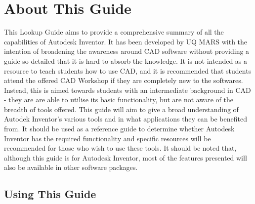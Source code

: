 \section{About This Guide}

This Lookup Guide aims to provide a comprehensive summary of all the capabilities of Autodesk Inventor. It has been developed by UQ MARS with the intention of broadening the awareness around CAD software without providing a guide so detailed that it is hard to absorb the knowledge. It is not intended as a resource to teach students how to use CAD, and it is recommended that students attend the offered CAD Workshop if they are completely new to the softwares. Instead, this is aimed towards students with an intermediate background in CAD - they are are able to utilise its basic functionality, but are not aware of the breadth of tools offered. This guide will aim to give a broad understanding of Autodek Inventor's various tools and in what applications they can be benefited from. It should be used as a reference guide to determine whether Autodesk Inventor has the required functionality and specific resources will be recommended for those who wish to use these tools. It should be noted that, although this guide is for Autodesk Inventor, most of the features presented will also be available in other software packages.

\subsection{Using This Guide}
